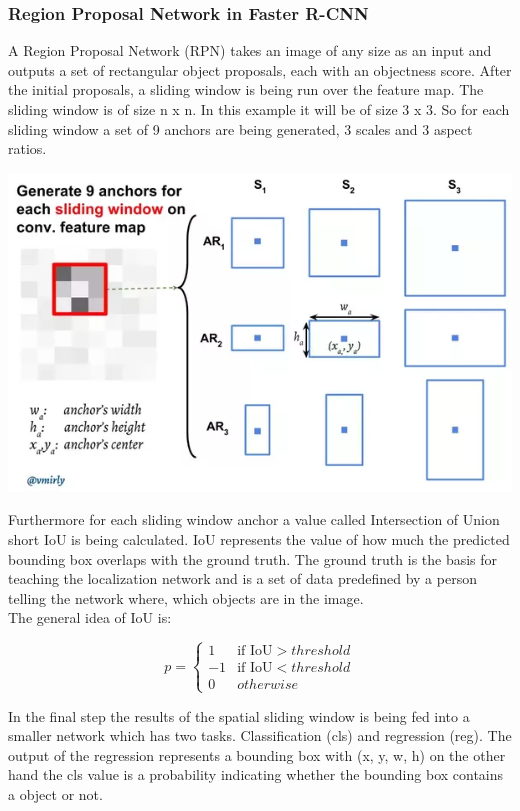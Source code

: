 \subsubsection{Region Proposal Network in Faster R-CNN}
A Region Proposal Network (RPN) takes an image of any size as an input and outputs a set of rectangular object proposals, each with an
objectness score. After the initial proposals, a sliding window is being run over the feature map. The sliding
window is of size n x n. In this example it will be of size 3 x 3. So for each sliding window a set of 9 anchors are being generated, 3
scales and 3 aspect ratios.\cite{fasterrcnn}
\begin{center}
    \includegraphics[scale=0.5]{images/rpn_anchors.png}
\end{center}
Furthermore for each sliding window anchor a value called Intersection of Union short IoU is being calculated. IoU represents the value of how
much the predicted bounding box overlaps with the ground truth. The ground truth is the basis for teaching the localization network and is a
set of data predefined by a person telling the network where, which objects are in the image. \\
The general idea of IoU is:\cite{fasterrcnn}
\begin{center}
    \begin{equation*}
        p =
        \begin{cases} 
            1 & \text{if IoU} > threshold \\
            -1 & \text{if IoU} < threshold \\
            0 & otherwise
        \end{cases}
    \end{equation*}
\end{center}
In the final step the results of the spatial sliding window is being fed into a smaller network which has two tasks. Classification (cls)
and regression (reg). The output of the regression represents a bounding box with (x, y, w, h) on the other hand the cls value is a
probability indicating whether the bounding box contains a object or not.\cite{fasterrcnn}

     
